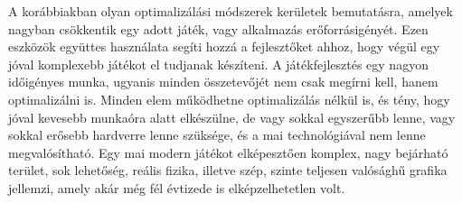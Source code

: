 \label{Chap:osszegzes}

A korábbiakban olyan optimalizálási módszerek kerületek bemutatásra, amelyek nagyban csökkentik egy adott játék, vagy alkalmazás erőforrásigényét. Ezen eszközök együttes használata segíti hozzá a fejlesztőket ahhoz, hogy végül egy jóval komplexebb játékot el tudjanak készíteni. A játékfejlesztés egy nagyon időigényes munka, ugyanis minden összetevőjét nem csak megírni kell, hanem optimalizálni is. Minden elem működhetne optimalizálás nélkül is, és tény, hogy jóval kevesebb munkaóra alatt elkészülne, de vagy sokkal egyszerűbb lenne, vagy sokkal erősebb hardverre lenne szüksége, és a mai technológiával nem lenne megvalósítható. Egy mai modern játékot elképesztően komplex, nagy bejárható terület, sok lehetőség, reális fizika, illetve szép, szinte teljesen valósághű grafika jellemzi, amely akár még fél évtizede is elképzelhetetlen volt.

